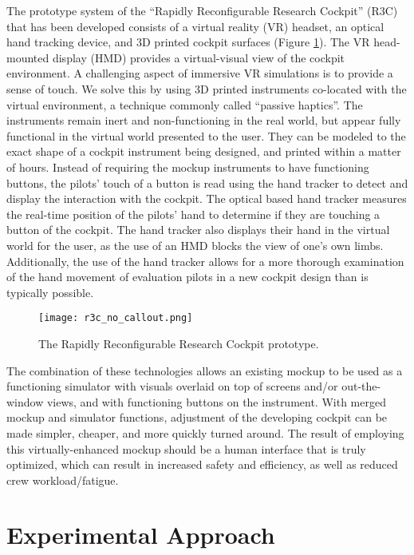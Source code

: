 The prototype system of the ``Rapidly Reconfigurable Research Cockpit'' (R3C) that has been developed consists of a virtual reality (VR) headset, an optical hand tracking device, and 3D printed cockpit surfaces (Figure \ref{fig:intro_r3c}).
The VR head-mounted display (HMD) provides a virtual-visual view of the cockpit environment.
A challenging aspect of immersive VR simulations is to provide a sense of touch.
We solve this by using 3D printed instruments co-located with the virtual environment, a technique commonly called ``passive haptics''.
 The instruments remain inert and non-functioning in the real world, but appear fully functional in the virtual world presented to the user.
They can be modeled to the exact shape of a cockpit instrument being designed, and printed within a matter of hours.
Instead of requiring the mockup instruments to have functioning buttons, the pilots' touch of a button is read using the hand tracker to detect and display the interaction with the cockpit.
The optical based hand tracker measures the real-time position of the pilots' hand to determine if they are touching a button of the cockpit.
The hand tracker also displays their hand in the virtual world for the user, as the use of an HMD blocks the view of one's own limbs.
Additionally, the use of the hand tracker allows for a more thorough examination of the hand movement of evaluation pilots in a new cockpit design than is typically possible.

\begin{figure}
    \centering
    \texttt{[image: r3c\_no\_callout.png]}
    \caption{The Rapidly Reconfigurable Research Cockpit prototype.}
    \label{fig:intro_r3c}
\end{figure}

The combination of these technologies allows an existing mockup to be used as a functioning simulator with visuals overlaid on top of screens and/or out-the-window views, and with functioning buttons on the instrument.
With merged mockup and simulator functions, adjustment of the developing cockpit can be made simpler, cheaper, and more quickly turned around.
The result of employing this virtually-enhanced mockup should be a human interface that is truly optimized, which can result in increased safety and efficiency, as well as reduced crew workload/fatigue.

\section{Experimental Approach}


